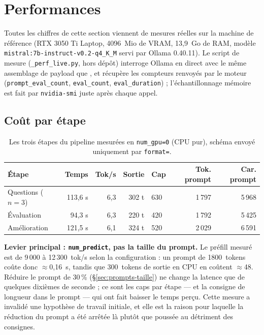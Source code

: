 \section{Performances}
\label{sec:perf}

Toutes les chiffres de cette section viennent de mesures réelles sur la machine
de référence (RTX 3050 Ti Laptop, 4096~Mio de VRAM, 13,9~Go de RAM, modèle
\texttt{mistral:7b-instruct-v0.2-q4\_K\_M} servi par Ollama 0.40.11). Le script
de mesure (\texttt{\_perf\_live.py}, hors dépôt) interroge Ollama en direct avec
le même assemblage de payload que , et récupère les compteurs
renvoyés par le moteur (\texttt{prompt\_eval\_count}, \texttt{eval\_count},
\texttt{eval\_duration}) ; l'échantillonnage mémoire est fait par
\texttt{nvidia-smi} juste après chaque appel.

\subsection{Coût par étape}
\label{sec:perf-latence}

\begin{small}
\begin{table}[H]
\centering
\caption{Les trois étapes du pipeline mesurées en \texttt{num\_gpu=0} (CPU pur),
schéma envoyé uniquement par \texttt{format=}.}
\label{tab:etapes-cpu}
\begin{tabular}{@{}l r r r l r r@{}}
\toprule
\textbf{Étape} & \textbf{Temps} & \textbf{Tok/s} & \textbf{Sortie} & \textbf{Cap} & \textbf{Tok. prompt} & \textbf{Car. prompt} \\
\midrule
Questions ($n=3$) & 113,6 s & 6,3 & 302 t & 630 & 1\,797 & 5\,968 \\
Évaluation        & 94,3 s  & 6,3 & 220 t & 420 & 1\,792 & 5\,425 \\
Amélioration      & 121,5 s & 6,1 & 324 t & 520 & 2\,029 & 6\,591 \\
\bottomrule
\end{tabular}
\end{table}
\end{small}

\textbf{Levier principal : \texttt{num\_predict}, pas la taille du prompt.}
Le préfill mesuré est de 9\,000 à 12\,300~tok/s selon la configuration : un
prompt de 1800~tokens coûte donc $\approx$0,16~s, tandis que 300~tokens de
sortie en CPU en coûtent $\approx$48. Réduire le prompt de 30\,\%
(§\ref{sec:prompts-taille}) ne change la latence que de quelques dixièmes de
seconde ; ce sont les caps par étape --- et la consigne de longueur dans le
prompt --- qui ont fait baisser le temps perçu. Cette mesure a invalidé une
hypothèse de travail initiale, et elle est la raison pour laquelle la
réduction du prompt a été arrêtée là plutôt que poussée au détriment des
consignes.


